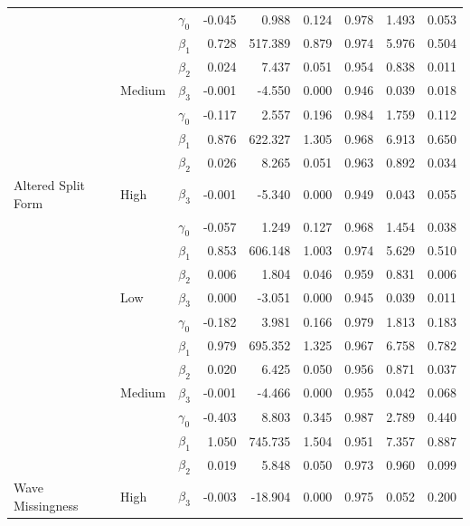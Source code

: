 \documentclass{svjour3}\usepackage[]{graphicx}\usepackage[]{color}
\newenvironment{knitrout}{}{} %
\begin{document}
\begin{knitrout}
\begin{table}[!h]
{\begin{tabular}[t]{l|l|l|r|r|r|r|r|r}
\cline{2-9}
 &  & $\gamma_0$ & -0.045 & 0.988 & 0.124 & 0.978 & 1.493 & 0.053\\
\cline{3-9}
 &  & $\beta_1$ & 0.728 & 517.389 & 0.879 & 0.974 & 5.976 & 0.504\\
\cline{3-9}
 &  & $\beta_2$ & 0.024 & 7.437 & 0.051 & 0.954 & 0.838 & 0.011\\
\cline{3-9}
 & \multirow{-4}{*}{\raggedright\arraybackslash Medium} & $\beta_3$ & -0.001 & -4.550 & 0.000 & 0.946 & 0.039 & 0.018\\
\cline{2-9}
 &  & $\gamma_0$ & -0.117 & 2.557 & 0.196 & 0.984 & 1.759 & 0.112\\
\cline{3-9}
 &  & $\beta_1$ & 0.876 & 622.327 & 1.305 & 0.968 & 6.913 & 0.650\\
\cline{3-9}
 &  & $\beta_2$ & 0.026 & 8.265 & 0.051 & 0.963 & 0.892 & 0.034\\
\cline{3-9}
\multirow{-12}{*}{\raggedright\arraybackslash Altered Split Form} & \multirow{-4}{*}{\raggedright\arraybackslash High} & $\beta_3$ & -0.001 & -5.340 & 0.000 & 0.949 & 0.043 & 0.055\\
\cline{1-9}
 &  & $\gamma_0$ & -0.057 & 1.249 & 0.127 & 0.968 & 1.454 & 0.038\\
\cline{3-9}
 &  & $\beta_1$ & 0.853 & 606.148 & 1.003 & 0.974 & 5.629 & 0.510\\
\cline{3-9}
 &  & $\beta_2$ & 0.006 & 1.804 & 0.046 & 0.959 & 0.831 & 0.006\\
\cline{3-9}
 & \multirow{-4}{*}{\raggedright\arraybackslash Low} & $\beta_3$ & 0.000 & -3.051 & 0.000 & 0.945 & 0.039 & 0.011\\
\cline{2-9}
 &  & $\gamma_0$ & -0.182 & 3.981 & 0.166 & 0.979 & 1.813 & 0.183\\
\cline{3-9}
 &  & $\beta_1$ & 0.979 & 695.352 & 1.325 & 0.967 & 6.758 & 0.782\\
\cline{3-9}
 &  & $\beta_2$ & 0.020 & 6.425 & 0.050 & 0.956 & 0.871 & 0.037\\
\cline{3-9}
 & \multirow{-4}{*}{\raggedright\arraybackslash Medium} & $\beta_3$ & -0.001 & -4.466 & 0.000 & 0.955 & 0.042 & 0.068\\
\cline{2-9}
 &  & $\gamma_0$ & -0.403 & 8.803 & 0.345 & 0.987 & 2.789 & 0.440\\
\cline{3-9}
 &  & $\beta_1$ & 1.050 & 745.735 & 1.504 & 0.951 & 7.357 & 0.887\\
\cline{3-9}
 &  & $\beta_2$ & 0.019 & 5.848 & 0.050 & 0.973 & 0.960 & 0.099\\
\cline{3-9}
\multirow{-12}{*}{\raggedright\arraybackslash Wave Missingness} & \multirow{-4}{*}{\raggedright\arraybackslash High} & $\beta_3$ & -0.003 & -18.904 & 0.000 & 0.975 & 0.052 & 0.200\\
\hline
\end{tabular}}
\end{table}


\end{knitrout}
\end{document}
